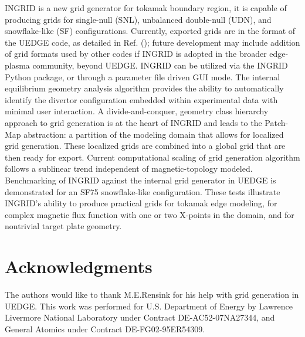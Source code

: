 INGRID is a new grid generator for tokamak boundary region, it is
capable of producing grids for single-null (SNL), unbalanced
double-null (UDN), and snowflake-like (SF) configurations. Currently,
exported grids are in the format of the UEDGE code, as detailed in
Ref. (\cite{Rensink2017}); future development may include addition of
grid formats used by other codes if INGRID is adopted in the broader
edge-plasma community, beyond UEDGE. INGRID can be utilized via the
INGRID Python package, or through a parameter file driven GUI
mode. The internal equilibrium geometry analysis algorithm provides
the ability to automatically identify the divertor configuration
embedded within experimental data with minimal user interaction. A
divide-and-conquer, geometry class hierarchy approach to grid
generation is at the heart of INGRID and leads to the Patch-Map
abstraction: a partition of the modeling domain that allows for
localized grid generation. These localized grids are combined into a
global grid that are then ready for export. Current computational
scaling of grid generation algorithm follows a sublinear trend
independent of magnetic-topology modeled. Benchmarking of INGRID
against the internal grid generator in UEDGE is demonstrated for an
SF75 snowflake-like configuration. These tests illustrate INGRID's
ability to produce practical grids for tokamak edge modeling, for
complex magnetic flux function with one or two X-points in the domain,
and for nontrivial target plate geometry.


\section{Acknowledgments}
The authors would like to thank M.E.Rensink for his help with grid
generation in UEDGE. This work was performed for U.S. Department of
Energy by Lawrence Livermore National Laboratory under Contract
DE-AC52-07NA27344, and General Atomics under Contract DE-FG02-95ER54309.
